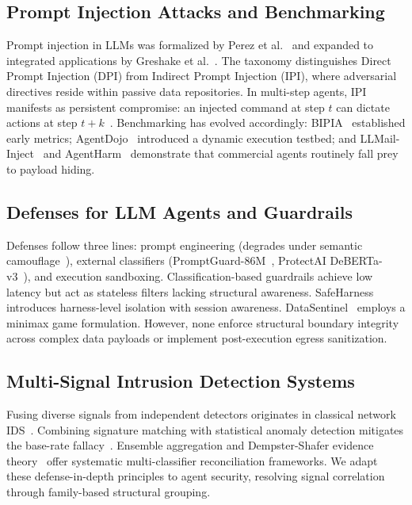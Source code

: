 \documentclass[runningheads]{llncs}
\begin{document}
\subsection{Prompt Injection Attacks and Benchmarking}
Prompt injection in LLMs was formalized by Perez et al.~\cite{perez2022red} and expanded to integrated applications by Greshake et al.~\cite{greshake2023not}. The taxonomy distinguishes Direct Prompt Injection (DPI) from Indirect Prompt Injection (IPI), where adversarial directives reside within passive data repositories. In multi-step agents, IPI manifests as persistent compromise: an injected command at step $t$ can dictate actions at step $t+k$~\cite{zhan2025injecagent}. Benchmarking has evolved accordingly: BIPIA~\cite{bipia2024} established early metrics; AgentDojo~\cite{agentdojo2024} introduced a dynamic execution testbed; and LLMail-Inject~\cite{llmail2024} and AgentHarm~\cite{agentharm2024} demonstrate that commercial agents routinely fall prey to payload hiding.

\subsection{Defenses for LLM Agents and Guardrails}
Defenses follow three lines: prompt engineering (degrades under semantic camouflage~\cite{liu2024promptinjection}), external classifiers (PromptGuard-86M~\cite{llamafirewall2024}, ProtectAI DeBERTa-v3~\cite{protectai2024}), and execution sandboxing. Classification-based guardrails achieve low latency but act as stateless filters lacking structural awareness. SafeHarness~\cite{liu2024safeharness} introduces harness-level isolation with session awareness. DataSentinel~\cite{datasentinel2025} employs a minimax game formulation. However, none enforce structural boundary integrity across complex data payloads or implement post-execution egress sanitization.

\subsection{Multi-Signal Intrusion Detection Systems}
Fusing diverse signals from independent detectors originates in classical network IDS~\cite{axelsson2000base,hutchins2011killchain}. Combining signature matching with statistical anomaly detection mitigates the base-rate fallacy~\cite{axelsson2000base,kittler1998combining}. Ensemble aggregation and Dempster-Shafer evidence theory~\cite{dempster1967upper} offer systematic multi-classifier reconciliation frameworks. We adapt these defense-in-depth principles to agent security, resolving signal correlation through family-based structural grouping.
\end{document}
